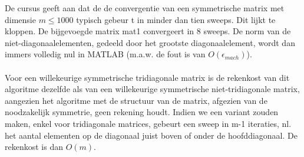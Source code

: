 \documentclass[a4paper]{article}
\begin{document}
De cursus geeft aan dat de de convergentie van een symmetrische matrix met dimensie $m\leq 1000$ typisch gebeur t in minder dan tien sweeps. Dit lijkt te kloppen. De bijgevoegde matrix mat1 convergeert in 8 sweeps. De norm van de niet-diagonaalelementen, gedeeld door het grootste diagonaalelement, wordt dan immers volledig nul in MATLAB (m.a.w. de fout is van $O(\epsilon_{mach})$).\\
\\
Voor een willekeurige symmetrische tridiagonale matrix is de rekenkost van dit algoritme dezelfde als van een willekeurige symmetrische niet-tridiagonale matrix, aangezien het algoritme met de structuur van de matrix, afgezien van de noodzakelijk symmetrie, geen rekening houdt. Indien we een variant zouden maken, enkel voor tridiagonale matrices, gebeurt een sweep in m-1 iteraties, nl. het aantal elementen op de diagonaal juist boven of onder de hoofddiagonaal. De rekenkost is dan $O(m)$.
\end{document}
